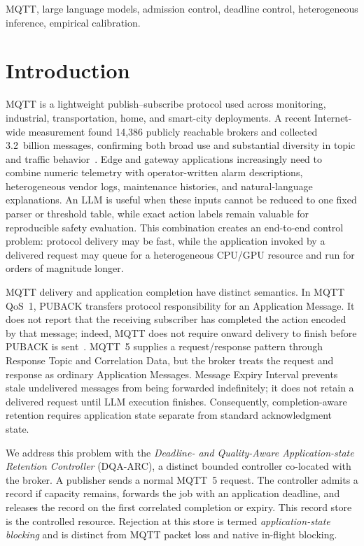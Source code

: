 \documentclass[journal]{IEEEtran}
\newcommand{\method}{DQA-ARC}
\begin{document}
\begin{IEEEkeywords}
MQTT, large language models, admission control, deadline control, heterogeneous inference, empirical calibration.
\end{IEEEkeywords}

\section{Introduction}
\label{sec:introduction}

MQTT is a lightweight publish--subscribe protocol used across monitoring, industrial, transportation, home, and smart-city deployments. A recent Internet-wide measurement found 14,386 publicly reachable brokers and collected 3.2~billion messages, confirming both broad use and substantial diversity in topic and traffic behavior~\cite{innamorati2026pulse}. Edge and gateway applications increasingly need to combine numeric telemetry with operator-written alarm descriptions, heterogeneous vendor logs, maintenance histories, and natural-language explanations. An LLM is useful when these inputs cannot be reduced to one fixed parser or threshold table, while exact action labels remain valuable for reproducible safety evaluation. This combination creates an end-to-end control problem: protocol delivery may be fast, while the application invoked by a delivered request may queue for a heterogeneous CPU/GPU resource and run for orders of magnitude longer.

MQTT delivery and application completion have distinct semantics. In MQTT QoS~1, PUBACK transfers protocol responsibility for an Application Message. It does not report that the receiving subscriber has completed the action encoded by that message; indeed, MQTT does not require onward delivery to finish before PUBACK is sent~\cite{oasis2019mqtt}. MQTT~5 supplies a request/response pattern through Response Topic and Correlation Data, but the broker treats the request and response as ordinary Application Messages. Message Expiry Interval prevents stale undelivered messages from being forwarded indefinitely; it does not retain a delivered request until LLM execution finishes. Consequently, completion-aware retention requires application state separate from standard acknowledgment state.

We address this problem with the \emph{Deadline- and Quality-Aware Application-state Retention Controller} (\method{}), a distinct bounded controller co-located with the broker. A publisher sends a normal MQTT~5 request. The controller admits a record if capacity remains, forwards the job with an application deadline, and releases the record on the first correlated completion or expiry. This record store is the controlled resource. Rejection at this store is termed \emph{application-state blocking} and is distinct from MQTT packet loss and native in-flight blocking.
\end{document}
